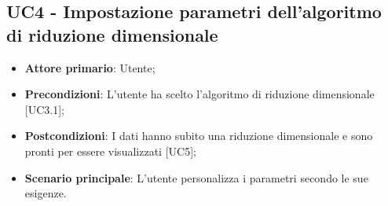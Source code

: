 \subsection{UC4 - Impostazione parametri dell'algoritmo di riduzione dimensionale}
\begin{itemize}
	\item \textbf{Attore primario}: Utente;
	\item \textbf{Precondizioni}: L'utente ha scelto l'algoritmo di riduzione dimensionale [UC3.1];
	\item \textbf{Postcondizioni}: I dati hanno subito una riduzione dimensionale e sono pronti per essere visualizzati [UC5];
	\item \textbf{Scenario principale}: L'utente personalizza i parametri secondo le sue esigenze.
\end{itemize}